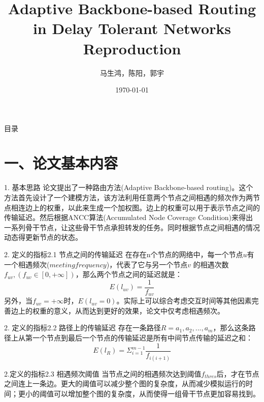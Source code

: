 \documentclass[12pt,aspectratio=43,table]{beamer}
\begin{document}
\begin{frame}
	\title{Adaptive Backbone-based Routing in Delay Tolerant Networks
    Reproduction}
	\author{马生鸿，陈阳，郭宇}
   \date{\today}
	\titlepage
\end{frame}


\begin{frame}{目录}
	\tableofcontents
\end{frame}

\section{一、论文基本内容}
\begin{frame}{1. 基本思路}
论文提出了一种路由方法(Adaptive Backbone-based routing)。这个方法首先设计了一个建模方法，该方法利用任意两个节点之间相遇的频次作为两节点相连边上的权重，以此来生成一个加权图。边上的权重可以用于表示节点之间的传输延迟。然后根据ANCC算法(Accumulated Node Coverage Condition)来得出一系列骨干节点，让这些骨干节点承担转发的任务。同时根据节点之间相遇的情况动态得更新节点的状态。	
\end{frame}

\begin{frame}{2. 定义的指标}{2.1 节点之间的传输延迟}
在存在n个节点的网络中，每一个节点$u$有一个相遇频次($meeting frequency$)，代表了它与另一个节点$v$ 的相遇次数$f_{uv},(f_{uv}\in[0,+\infty])$，那么两个节点之间的延迟就是：
\begin{equation}
E(l_{uv})=\frac{1}{f_{uv}}
\end{equation}
另外，当$f_{uv}=+\infty$时，$E(l_{uv}=0)$。实际上可以综合考虑交互时间等其他因素完善边上的权重的意义，从而达到更好的效果，论文中仅考虑相遇频次。
\end{frame}

\begin{frame}{2. 定义的指标}{2.2 路径上的传输延迟}
存在一条路径$R = a_1,a_2,...,a_m$，那么这条路径上从第一个节点到最后一个节点的传输延迟是所有中间节点传输的延迟之和：
\begin{equation}
E(l_R)=\Sigma^{m-1}_{i=1}\frac{1}{f_{i(i+1)}}
\end{equation}
\end{frame}

\begin{frame}{2.定义的指标}{2.3 相遇频次阈值}
当节点之间的相遇频次达到阈值$f_{thres}$后，才在节点之间连上一条边。更大的阈值可以减少整个图的复杂度，从而减少模拟运行的时间；更小的阈值可以增加整个图的复杂度，从而使得一组骨干节点更加容易找到。
\end{frame}
\end{document}
